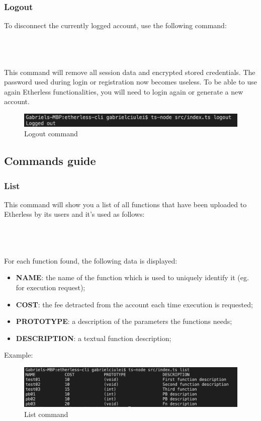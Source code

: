 \subsubsection{Logout}
To disconnect the currently logged account, use the following command:\\\\
\centerline{}\\\\
This command will remove all session data and encrypted stored credentials. The password used during login or registration now becomes useless. To be able to use again Etherless functionalities, you will need to login again or generate a new account.\\
\begin{figure}[h]
	\centering
	\includegraphics[width=\textwidth]{res/img/Screenshot_logout.png}
	\caption{Logout command}
\end{figure}
\newpage
\subsection{Commands guide}
\subsubsection{List}
This command will show you a list of all functions that have been uploaded to Etherless by its users and it's used as follows:\\\\
\centerline {}\\\\
For each function found, the following data is displayed:
\begin{itemize}
	\item \textbf{NAME}: the name of the function which is used to uniquely identify it (eg. for execution request);
	\item \textbf{COST}: the fee detracted from the account each time execution is requested;
	\item \textbf{PROTOTYPE}: a description of the parameters the functions needs;
	\item \textbf{DESCRIPTION}: a textual function description;
\end{itemize}
Example:
\begin{figure}[h]
	\begin{center}
	\includegraphics[width=\textwidth]{res/img/Screenshot_list.jpg}
	\caption{List command}
	\end{center}
\end{figure}

